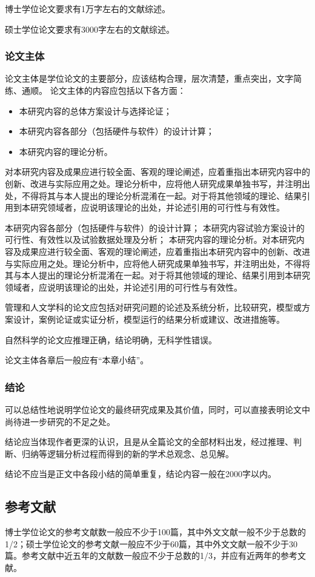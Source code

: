 博士学位论文要求有1万字左右的文献综述。

硕士学位论文要求有3000字左右的文献综述。

\subsubsection{论文主体}
论文主体是学位论文的主要部分，应该结构合理，层次清楚，重点突出，文字简练、通顺。
论文主体的内容应包括以下各方面：
\begin{itemize}
    \item 本研究内容的总体方案设计与选择论证；
    \item 本研究内容各部分（包括硬件与软件）的设计计算；
    \item 本研究内容的理论分析。
\end{itemize}

对本研究内容及成果应进行较全面、客观的理论阐述，应着重指出本研究内容中的创新、改进与实际应用之处。理论分析中，应将他人研究成果单独书写，并注明出处，不得将其与本人提出的理论分析混淆在一起。对于将其他领域的理论、结果引用到本研究领域者，应说明该理论的出处，并论述引用的可行性与有效性。


本研究内容各部分（包括硬件与软件）的设计计算；
本研究内容试验方案设计的可行性、有效性以及试验数据处理及分析；
本研究内容的理论分析。对本研究内容及成果应进行较全面、客观的理论阐述，应着重指出本研究内容中的创新、改进与实际应用之处。理论分析中，应将他人研究成果单独书写，并注明出处，不得将其与本人提出的理论分析混淆在一起。对于将其他领域的理论、结果引用到本研究领域者，应说明该理论的出处，并论述引用的可行性与有效性。

管理和人文学科的论文应包括对研究问题的论述及系统分析，比较研究，模型或方案设计，案例论证或实证分析，模型运行的结果分析或建议、改进措施等。

自然科学的论文应推理正确，结论明确，无科学性错误。

论文主体各章后一般应有“本章小结”。

\subsubsection{结论}
可以总结性地说明学位论文的最终研究成果及其价值，同时，可以直接表明论文中尚待进一步研究的不足之处。

结论应当体现作者更深的认识，且是从全篇论文的全部材料出发，经过推理、判断、归纳等逻辑分析过程而得到的新的学术总观念、总见解。

结论不应当是正文中各段小结的简单重复，结论内容一般在2000字以内。

\subsection{参考文献}
博士学位论文的参考文献数一般应不少于100篇，其中外文文献一般不少于总数的1/2；硕士学位论文的参考文献一般应不少于60篇，其中外文文献一般不少于30篇。参考文献中近五年的文献数一般应不少于总数的1/3，并应有近两年的参考文献。
